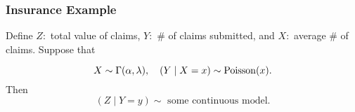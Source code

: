 \subsubsection{Insurance Example}
\begin{eg}
Define
    $Z:$ total value of claims, $Y:$ \# of claims submitted, and $X:$ average \# of claims. Suppose that

    
    $$X\sim \Gamma(\alpha, \lambda), \quad (Y\mid X=x)\sim \operatorname*{Poisson}(x).
    $$
    Then
    $$
    (Z\mid Y=y)\sim \text{ some continuous model}.
    $$
\end{eg}

